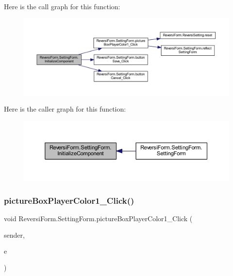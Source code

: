 Here is the call graph for this function\+:\nopagebreak
\begin{figure}[H]
\begin{center}
\leavevmode
\includegraphics[width=350pt]{class_reversi_form_1_1_setting_form_a9b663029f37a28044ff2300fc66dc859_cgraph}
\end{center}
\end{figure}
Here is the caller graph for this function\+:\nopagebreak
\begin{figure}[H]
\begin{center}
\leavevmode
\includegraphics[width=350pt]{class_reversi_form_1_1_setting_form_a9b663029f37a28044ff2300fc66dc859_icgraph}
\end{center}
\end{figure}
\mbox{\label{class_reversi_form_1_1_setting_form_a71422ab30aabb52bdc6f25b5e84aefea}} 
\subsubsection{\texorpdfstring{picture\+Box\+Player\+Color1\+\_\+\+Click()}{pictureBoxPlayerColor1\_Click()}}
{\footnotesize\ttfamily void Reversi\+Form.\+Setting\+Form.\+picture\+Box\+Player\+Color1\+\_\+\+Click (\begin{DoxyParamCaption}\item[{object}]{sender,  }\item[{Event\+Args}]{e }\end{DoxyParamCaption})\hspace{0.3cm}{\ttfamily [private]}}



